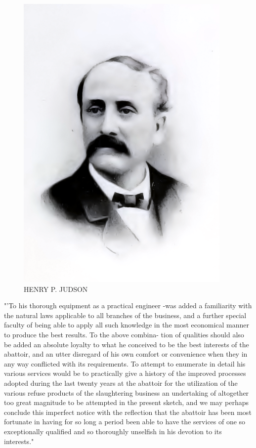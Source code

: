 \documentclass[oneside]{book}
\begin{document}
\begin{figure}[htp]
	\centering
	\includegraphics[scale=1]{../white/henryPJudsonWhite.png}
	\caption {HENRY P. JUDSON}
\end{figure}

"'To his thorough equipment as a practical engineer -was 
added a familiarity with the natural laws applicable to all 
branches of the business, and a further special faculty of 
being able to apply all such knowledge in the most economical 
manner to produce the best results. To the above combina- 
tion of qualities should also be added an absolute loyalty to 
what he conceived to be the best interests of the abattoir, 
and an utter disregard of his own comfort or convenience 
when they in any way conflicted with its requirements. To 
attempt to enumerate in detail his various services would be 
to practically give a history of the improved processes 
adopted during the last twenty years at the abattoir for the 
utilization of the various refuse products of the slaughtering 
business  an undertaking of altogether too great magnitude 
to be attempted in the present sketch, and we may perhaps 
conclude this imperfect notice with the reflection that the 
abattoir has been most fortunate in having for so long a 
period been able to have the services of one so exceptionally 
qualified and so thoroughly unselfish in his devotion to its 
interests." 
\end{document}
